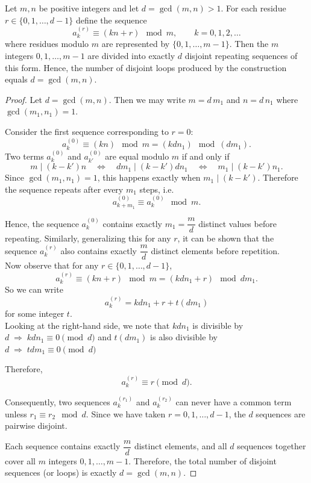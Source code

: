 \documentclass[10pt,a4paper]{amsart}
\begin{document}
\begin{proposition}
Let $m,n$ be positive integers and let $d=\gcd(m,n)>1$. 
For each residue $r\in\{0,1,\dots,d-1\}$ define the sequence
\[
a^{(r)}_k \equiv (k n + r) \mod m, \qquad k=0,1,2,\dots
\]
where residues modulo $m$ are represented by $\{0,1,\dots,m-1\}$. 
Then the $m$ integers $0,1,\dots,m-1$ are divided into exactly $d$ disjoint repeating sequences of this form. 
Hence, the number of disjoint loops produced by the construction equals $d=\gcd(m,n)$.
\end{proposition}

\begin{proof}
Let $d=\gcd(m,n)$. 
Then we may write $m=d\,m_1$ and $n=d\,n_1$ where $\gcd(m_1,n_1)=1$.

\noindent Consider the first sequence corresponding to $r=0$:
\[
a^{(0)}_k \equiv (k n) \mod m = (k d n_1) \mod{(d m_1)}.
\]
Two terms $a^{(0)}_k$ and $a^{(0)}_{k'}$ are equal modulo $m$ if and only if 
\[
m \mid (k-k')n \quad \iff\quad d m_1 \mid (k-k')d n_1 
\quad \iff\quad m_1 \mid (k-k')n_1.
\]
Since $\gcd(m_1,n_1)=1$, this happens exactly when $m_1\mid (k-k')$. 
Therefore the sequence repeats after every $m_1$ steps, i.e.
\[
a^{(0)}_{k+m_1} \equiv a^{(0)}_k \mod m.
\]

Hence, the sequence $a^{(0)}_k$ contains exactly $m_1 = \dfrac{m}{d}$ distinct values before repeating. 
Similarly, generalizing this for any $r$, it can be shown that the sequence $a^{(r)}_k$ also contains exactly $\dfrac{m}{d}$ distinct elements before repetition.\\


\noindent Now observe that for any $r\in\{0,1,\dots,d-1\}$,
\[
a^{(r)}_k \equiv (k n + r) \mod m = (k d n_1 + r) \mod{d m_1}.
\]
\noindent
So we can write
\[
a^{(r)}_k = k d n_1 + r + t (d m_1)
\]
for some integer \(t\).\\


\noindent
Looking at the right-hand side, we note that \(k d n_1\) is divisible by \(d \;\Rightarrow\; k d n_1 \equiv 0 \pmod{d}\) and \(t (d m_1)\) is also divisible by \(d \;\Rightarrow\; t d m_1 \equiv 0 \pmod{d}\) 

\noindent
Therefore,
\[
a^{(r)}_k \equiv r \pmod{d}.
\]

\noindent Consequently, two sequences $a^{(r_1)}_k$ and $a^{(r_2)}_k$ can never have a common term unless $r_1\equiv r_2 \mod d$. 
Since we have taken $r=0,1,\dots,d-1$, the $d$ sequences are pairwise disjoint.

\noindent Each sequence contains exactly $\dfrac{m}{d}$ distinct elements, and all $d$ sequences together cover all $m$ integers $0,1,\dots,m-1$. 
Therefore, the total number of disjoint sequences (or loops) is exactly $d=\gcd(m,n)$.
 
\end{proof}
\end{document}
